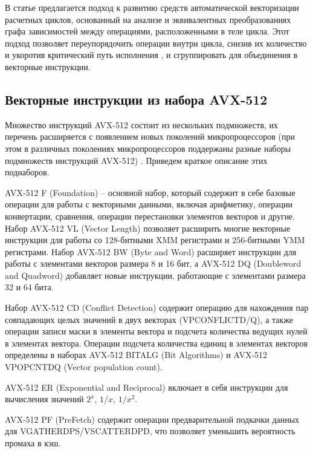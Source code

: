 В статье \cite{Tayeb2023VecAuto} предлагается подход к развитию средств автоматической векторизации расчетных циклов, основанный на анализе и эквивалентных преобразованиях графа зависимостей между операциями, расположенными в теле цикла.
Этот подход позволяет переупорядочить операции внутри цикла, снизив их количество и укоротив критический путь исполнения \cite{Laukemann2019VecAuto}\label{term:critical_path}, и сгруппировать для объединения в векторные инструкции.

\subsection{Векторные инструкции из набора AVX-512}

Множество инструкций AVX-512 состоит из нескольких подмножеств, их перечень расширяется с появлением новых поколений микропроцессоров (при этом в различных поколениях микропроцессоров поддержаны разные наборы подмножеств инструкций AVX-512) \cite{IntelSDM2025}.
Приведем краткое описание этих поднаборов.

AVX-512 F (Foundation) -- основной набор, который содержит в себе базовые операции для работы с векторными данными, включая арифметику, операции конвертации, сравнения, операции перестановки элементов векторов и другие.
Набор AVX-512 VL (Vector Length)\label{abbr:vl} позволяет расширить многие векторные инструкции для работы со 128-битными XMM регистрами и 256-битными YMM регистрами.
Набор AVX-512 BW (Byte and Word)\label{abbr:bw} расширяет инструкции для работы с элементами векторов размера 8 и 16 бит, а AVX-512 DQ (Doubleword and Quadword)\label{abbr:dq} добавляет новые инструкции, работающие с элементами размера 32 и 64 бита.

Набор AVX-512 CD (Conflict Detection)\label{abbr:cd} содержит операцию для нахождения пар совпадающих целых значений в двух векторах (VPCONFLICTD/Q), а также операции записи маски в элементы вектора и подсчета количества ведущих нулей в элементах вектора.
Операции подсчета количества единиц в элементах векторов определены в наборах AVX-512 BITALG (Bit Algorithms) и AVX-512 VPOPCNTDQ (Vector population count).

AVX-512 ER (Exponential and Reciprocal)\label{abbr:er} включает в себя инструкции для вычисления значений $2^x$, $1/x$, $1/{x^2}$.

AVX-512 PF (PreFetch)\label{abbr:pf} содержит операции предварительной подкачки данных для VGATHERDPS/VSCATTERDPD, что позволяет уменьшить вероятность промаха в кэш.

